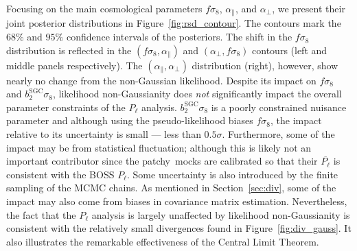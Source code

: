 \documentclass[12pt, letterpaper, preprint]{aastex6}
\let\oldmarginpar\marginpar
\renewcommand\marginpar[1]{\-\oldmarginpar[\raggedleft\footnotesize #1]%
  {\raggedright\footnotesize #1}}
\newcommand{\todo}[1]{\marginpar{\color{red}TODO}{\color{red}#1}}
\newcommand{\patchy}{{\fontshape\scdefault\selectfont patchy}}
\begin{document}
Focusing on the main cosmological parameters $f \sigma_8$, 
$\alpha_\parallel$, and $\alpha_\perp$, we present their 
joint posterior distributions in Figure~\ref{fig:rsd_contour}.  
The contours mark the $68\%$ and $95\%$ confidence intervals
of the posteriors. The shift in the $f \sigma_8$ distribution 
is reflected in the
$(f\sigma_8, \alpha_\parallel)$ and $(\alpha_\perp, f\sigma_8)$ 
contours (left and middle panels respectively). The 
$(\alpha_\parallel, \alpha_\perp)$ distribution (right), however, show nearly 
no change from the non-Gaussian likelihood. %
Despite its impact on $f \sigma_8$ and $b_2^\mathrm{SGC} \sigma_8$, 
likelihood non-Gaussianity does \emph{not}
significantly impact the overall parameter constraints of the $P_\ell$ 
analysis. $b_2^\mathrm{SGC} \sigma_8$ is a poorly constrained nuisance 
parameter and although using the pseudo-likelihood biases $f \sigma_8$, 
the impact relative to its uncertainty is small --- less than $0.5 \sigma$. 
Furthermore, some of the impact may be from statistical fluctuation; although
this is likely not an important contributor since the \patchy~mocks are 
calibrated so that their $\overline{P_\ell}$ is consistent with the BOSS $P_\ell$. 
Some uncertainty is also introduced by the finite sampling of the MCMC chains. 
As mentioned in Section~\ref{sec:div}, some of the impact may also come 
from biases in covariance matrix estimation. Nevertheless, the fact that 
the $P_\ell$ analysis is largely unaffected by likelihood 
non-Gaussianity is consistent with the relatively small divergences found 
in Figure~\ref{fig:div_gauss}. It also illustrates
the remarkable effectiveness of the Central Limit Theorem. 
\end{document}
